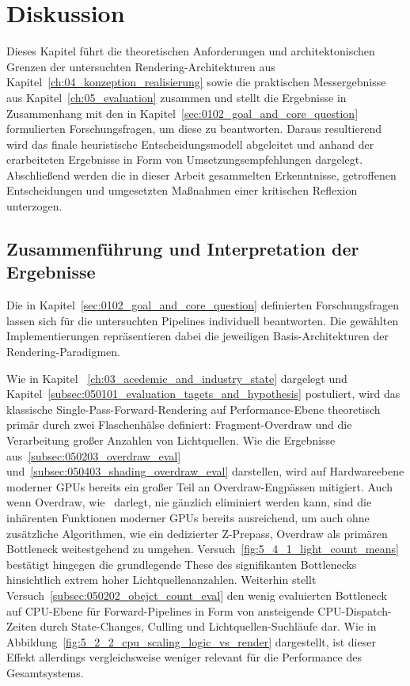 \chapter{Diskussion}
\label{ch:06_diskussion}

Dieses Kapitel führt die theoretischen Anforderungen und architektonischen Grenzen der untersuchten
Rendering-Architekturen aus Kapitel~\ref{ch:04_konzeption_realisierung} sowie die praktischen Messergebnisse aus
Kapitel~\ref{ch:05_evaluation} zusammen und stellt die Ergebnisse in Zusammenhang mit den in
Kapitel~\ref{sec:0102_goal_and_core_question} formulierten Forschungsfragen, um diese zu beantworten.
Daraus resultierend wird das finale heuristische Entscheidungsmodell abgeleitet und anhand der erarbeiteten Ergebnisse
in Form von Umsetzungsempfehlungen dargelegt.
Abschließend werden die in dieser Arbeit gesammelten Erkenntnisse, getroffenen Entscheidungen und umgesetzten Maßnahmen
einer kritischen Reflexion unterzogen.


\section{Zusammenführung und Interpretation der Ergebnisse}
\label{sec:0601_interpretation_results}

Die in Kapitel~\ref{sec:0102_goal_and_core_question} definierten Forschungsfragen lassen sich für die untersuchten
Pipelines individuell beantworten.
Die gewählten Implementierungen repräsentieren dabei die jeweiligen Basis-Architekturen der Rendering-Paradigmen.

Wie in Kapitel ~\ref{ch:03_acedemic_and_industry_state} dargelegt und
Kapitel~\ref{subsec:050101_evaluation_tagets_and_hypothesis} postuliert, wird das klassische
Single-Pass-Forward-Rendering auf Performance-Ebene theoretisch primär durch zwei Flaschenhälse definiert:
Fragment-Overdraw und die Verarbeitung großer Anzahlen von Lichtquellen.
Wie die Ergebnisse aus~\ref{subsec:050203_overdraw_eval} und~\ref{subsec:050403_shading_overdraw_eval} darstellen,
wird auf Hardwareebene moderner \ac{GPU}s bereits ein großer Teil an Overdraw-Engpässen mitigiert.
Auch wenn Overdraw, wie~\textcite[Abschn.~1,~Punkt~5]{Thaler2011DeferredRendering} darlegt, nie gänzlich eliminiert
werden kann, sind die inhärenten Funktionen moderner \acp{GPU} bereits ausreichend, um auch ohne zusätzliche
Algorithmen, wie ein dedizierter Z-Prepass, Overdraw als primären Bottleneck weitestgehend zu umgehen.
Versuch~\ref{fig:5_4_1_light_count_means} bestätigt hingegen die grundlegende These des signifikanten Bottlenecks
hinsichtlich extrem hoher Lichtquellenanzahlen.
Weiterhin stellt Versuch~\ref{subsec:050202_obejct_count_eval} den wenig evaluierten Bottleneck auf \ac{CPU}-Ebene für
Forward-Pipelines in Form von ansteigende \ac{CPU}-Dispatch-Zeiten durch State-Changes, Culling und
Lichtquellen-Suchläufe dar.
Wie in Abbildung~\ref{fig:5_2_2_cpu_scaling_logic_vs_render} dargestellt, ist dieser Effekt allerdings vergleichsweise
weniger relevant für die Performance des Gesamtsystems.

